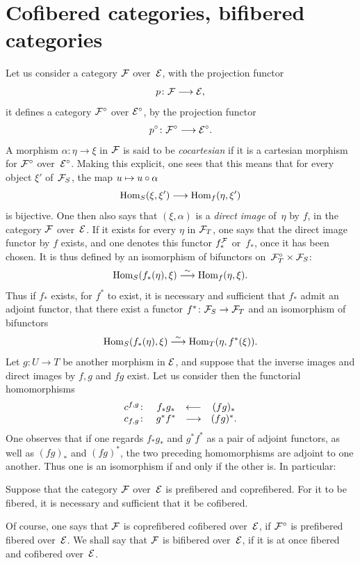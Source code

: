 \section{Cofibered categories, bifibered categories}
\label{VI.10}
Let us consider a category $\cal{F}$ over~$\cal{E}$,
with the projection functor
$$
p\colon \cal{F}\to \cal{E},
$$
it defines a category $\cal{F}^\circ$ over
$\cal{E}^\circ$, by the projection functor
$$
p^\circ\colon \cal{F}^\circ\to \cal{E}^\circ.
$$
A morphism $\alpha\colon \eta\to\xi$ in $\cal{F}$ is said to be
\emph{cocartesian} if it is a cartesian morphism for
$\cal{F}^\circ$ over~$\cal{E}^\circ$. Making this explicit, one sees that this
means that for every object $\xi'$ of~$\cal{F}_S$, the map
$u\mto u\circ \alpha$
$$
\Hom_S(\xi,\xi')\to\Hom_f(\eta,\xi')
$$
is bijective. One then also says that $(\xi,\alpha)$ is a
\emph{direct image}
of~$\eta$ by $f$, in the category $\cal{F}$ over~$\cal{E}$. If
it exists for every $\eta$ in $\cal{F}_T$, one says that the
direct image functor by $f$ exists, and one denotes this functor
$f_*^{\cal{F}}$ or~$f_*$,
once it has been chosen. It is thus defined by
an isomorphism of bifunctors on~$\cal{F}_T^\circ\times\cal{F}_S$:
$$
\Hom_S(f_*(\eta),\xi)\isomto \Hom_f(\eta,\xi).
$$
Thus if $f_*$ exists, for $f^*$ to exist, it is necessary and sufficient that
$f_*$
admit an adjoint functor, \ie that there exist a functor
$f^*\colon \cal{F}_S\to\cal{F}_T$ and an isomorphism of bifunctors
$$
\Hom_S(f_*(\eta),\xi)\isomto \Hom_T(\eta,f^*(\xi)).
$$
Let $g\colon U\to T$ be another morphism in $\cal{E}$, and suppose
that the inverse images and direct images by $f,g$ and $fg$
exist. Let us consider then the functorial homomorphisms
$$
\begin{array}{cccc}
c^{f,g}\colon&f_*g_*&\dpl\from&(fg)_*\\
c_{f,g}\colon&g^*f^*&\dpl\to&(fg)^*.
\end{array}
$$
One observes that if one regards $f_*g_*$ and $g^*f^*$ as a
pair of adjoint functors, as well as $(fg)_*$ and $(fg)^*$, the two
preceding homomorphisms are adjoint to one another. Thus
one is an isomorphism if and only if the other is. In
particular:
\begin{proposition}
\label{VI.10.1} Suppose that the category $\cal{F}$ over~$\cal{E}$
is prefibered and coprefibered. For it to be
fibered, it is necessary and sufficient that it be
cofibered.
\end{proposition}

Of course, one says that $\cal{F}$ is coprefibered \resp cofibered
over~$\cal{E}$, if $\cal{F}^\circ$ is prefibered \resp fibered over~$\cal{E}$. We shall say that $\cal{F}$ is bifibered
over~$\cal{E}$,
if it is at once fibered and cofibered over~$\cal{E}$.

